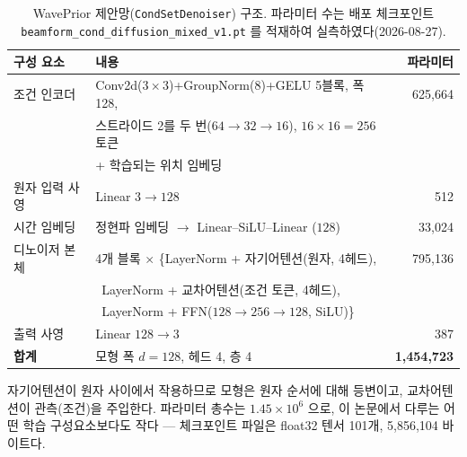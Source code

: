 \documentclass[11pt]{report}
\numberwithin{equation}{chapter}
\numberwithin{figure}{chapter}
\numberwithin{table}{chapter}
\begin{document}
\begin{table}[htbp]
\centering
\caption{WavePrior 제안망(\texttt{CondSetDenoiser}) 구조.
파라미터 수는 배포 체크포인트
\texttt{beamform\_cond\_diffusion\_mixed\_v1.pt} 를 적재하여 실측하였다(2026-08-27).}
\label{tab:waveprior_arch}
\small
\begin{tabular}{llr}
\toprule
구성 요소 & 내용 & 파라미터 \\
\midrule
조건 인코더 & Conv2d($3\times3$)+GroupNorm(8)+GELU 5블록, 폭 128, & 625{,}664 \\
             & 스트라이드 2를 두 번($64\to32\to16$), $16\times16=256$ 토큰 & \\
             & + 학습되는 위치 임베딩 & \\
원자 입력 사영 & Linear $3 \to 128$ & 512 \\
시간 임베딩 & 정현파 임베딩 $\to$ Linear--SiLU--Linear ($128$) & 33{,}024 \\
디노이저 본체 & 4개 블록 $\times$ \{LayerNorm + 자기어텐션(원자, 4헤드), & 795{,}136 \\
              & \ LayerNorm + 교차어텐션(조건 토큰, 4헤드), & \\
              & \ LayerNorm + FFN($128\to256\to128$, SiLU)\} & \\
출력 사영 & Linear $128 \to 3$ & 387 \\
\midrule
\textbf{합계} & 모형 폭 $d=128$, 헤드 4, 층 4 & \textbf{1{,}454{,}723} \\
\bottomrule
\end{tabular}
\end{table}

자기어텐션이 원자 사이에서 작용하므로 모형은 원자 순서에 대해 등변이고, 교차어텐션이
관측(조건)을 주입한다. 파라미터 총수는 $1.45\times10^{6}$ 으로, 이 논문에서 다루는
어떤 학습 구성요소보다도 작다 --- 체크포인트 파일은 float32 텐서 101개, 5{,}856{,}104
바이트다.
\end{document}
